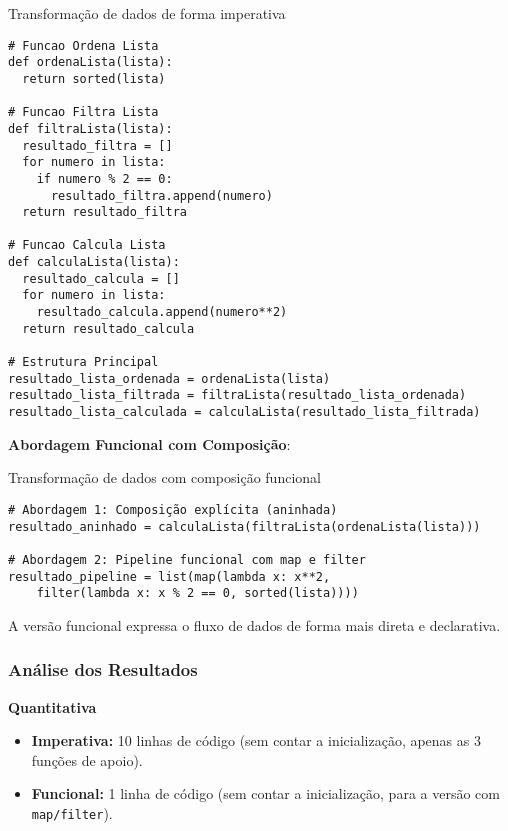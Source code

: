 \begin{listing}[H]{Transformação de dados de forma imperativa}
    \begin{verbatim}
# Funcao Ordena Lista
def ordenaLista(lista):
  return sorted(lista)

# Funcao Filtra Lista
def filtraLista(lista):
  resultado_filtra = []
  for numero in lista:
    if numero % 2 == 0:
      resultado_filtra.append(numero)
  return resultado_filtra

# Funcao Calcula Lista
def calculaLista(lista):
  resultado_calcula = []
  for numero in lista:
    resultado_calcula.append(numero**2)
  return resultado_calcula

# Estrutura Principal
resultado_lista_ordenada = ordenaLista(lista)
resultado_lista_filtrada = filtraLista(resultado_lista_ordenada)
resultado_lista_calculada = calculaLista(resultado_lista_filtrada)
    \end{verbatim}
    \label{listing:imperativa}
\end{listing}

\textbf{Abordagem Funcional com Composição}:
\begin{listing}[H]{Transformação de dados com composição funcional}
    \label{listing:funcional}
    \begin{verbatim}
# Abordagem 1: Composição explícita (aninhada)
resultado_aninhado = calculaLista(filtraLista(ordenaLista(lista)))

# Abordagem 2: Pipeline funcional com map e filter
resultado_pipeline = list(map(lambda x: x**2, 
    filter(lambda x: x % 2 == 0, sorted(lista))))
    \end{verbatim}
\end{listing}

A versão funcional expressa o fluxo de dados de forma mais direta e declarativa.

\subsubsection{Análise dos Resultados}
\textbf{Quantitativa}
\begin{itemize}
    \item \textbf{Imperativa:} 10 linhas de código (sem contar a inicialização, apenas as 3 funções de apoio).
    \item \textbf{Funcional:} 1 linha de código (sem contar a inicialização, para a versão com \texttt{map/filter}).
\end{itemize}

